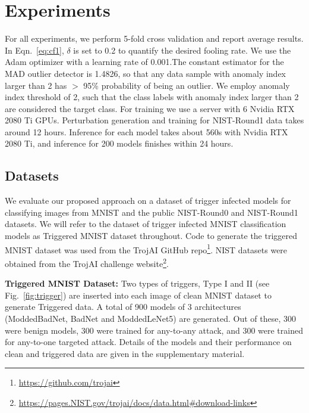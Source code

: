 \documentclass{article}
\begin{document}
\vspace{-4mm}
\section{Experiments}
\vspace{-4mm}

For all experiments, we perform 5-fold cross validation and report average results.  In Eqn.~\ref{eq:cf1}, $\delta$ is set to 0.2 to quantify the desired fooling rate.  We use the Adam optimizer with a learning rate of 0.001.The constant estimator for the MAD outlier detector is 1.4826, so that any data sample with anomaly index larger than 2 has $>$ 95\% probability of being an outlier. We employ anomaly index threshold of 2, such that the class labels with anomaly index larger than 2 are considered the target class. For training we use a server with 6 Nvidia RTX 2080 Ti GPUs. Perturbation generation and training for NIST-Round1 data takes around 12 hours. Inference for each model takes about 560s with Nvidia RTX 2080 Ti, and inference for 200 models finishes within 24 hours. 



\vspace{-3mm}
\subsection{Datasets}
\vspace{-2mm}

We evaluate our proposed approach on a dataset of trigger infected models for classifying images from MNIST and the public NIST-Round0 and NIST-Round1 datasets. We will refer to the dataset of trigger infected MNIST classification models as Triggered MNIST dataset throughout. Code to generate the triggered MNIST dataset was used from the TrojAI GitHub repo\footnote{\url{https://github.com/trojai}}. NIST datasets were obtained from the TrojAI challenge website\footnote{\url{https://pages.NIST.gov/trojai/docs/data.html\#download-links}}.


\textbf{Triggered MNIST Dataset:}
Two types of triggers, Type I and II (see Fig.~\ref{fig:trigger}) are inserted into each image of clean MNIST dataset to generate Triggered data. A total of 900 models of 3 architectures (ModdedBadNet, BadNet and ModdedLeNet5) are generated. Out of these, 300 were benign models, 300 were trained for any-to-any attack, and 300 were trained for any-to-one targeted attack. Details of the models and their performance on clean and triggered data are given in the supplementary material.
\end{document}

